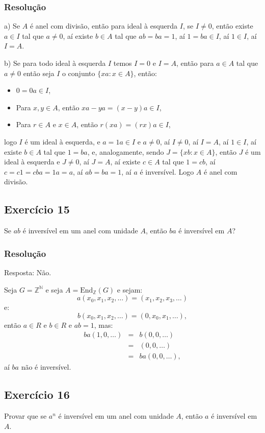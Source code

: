 \documentclass[10pt,a4paper]{article}
\begin{document}
\subsubsection*{Resolução}

a) Se $A$ é anel com divisão, então para ideal à esquerda $I$, se $I\neq 0$, então existe $a\in I$ tal que $a\neq 0$, aí existe $b\in A$ tal que $ab=ba=1$, aí $1=ba\in I$, aí $1\in I$, aí $I=A$.

\medskip
\noindent
b) Se para todo ideal à esquerda $I$ temos $I=0$ e $I=A$, então para $a\in A$ tal que $a\neq 0$ então seja $I$ o conjunto $\{xa:x\in A\}$, então:
\begin{itemize}
\item $0=0a\in I$,
\item Para $x,y\in A$, então $xa-ya=(x-y)a\in I$,
\item Para $r\in A$ e $x\in A$, então $r(xa)=(rx)a\in I$,
\end{itemize}
logo $I$ é um ideal à esquerda, e $a=1a\in I$ e $a\neq 0$, aí $I\neq0$, aí $I=A$, aí $1\in I$, aí existe $b\in A$ tal que $1=ba$, e, analogamente, sendo $J=\{xb:x\in A\}$, então $J$ é um ideal à esquerda e $J\neq 0$, aí $J=A$, aí existe $c\in A$ tal que $1=cb$, aí $c=c1=cba=1a=a$, aí $ab=ba=1$, aí $a$ é inversível. Logo $A$ é anel com divisão.

\subsection*{Exercício 15}
Se $ab$ é inversível em um anel com unidade $A$, então $ba$ é inversível em $A$?

\subsubsection*{Resolução}

Resposta: Não.

\medskip
\noindent
Seja $G=\mathbb{Z}^\mathbb{N}$ e seja $A=\mathrm{End}_\mathbb{Z}(G)$ e sejam:
\[
a(x_0,x_1,x_2,\dots)=(x_1,x_2,x_3,\dots)
\]
e:
\[
b(x_0,x_1,x_2,\dots)=(0,x_0,x_1,\dots),
\]
então $a\in R$ e $b\in R$ e $ab=1$, mas:
\[
\begin{array}{rcl}
ba(1,0,\dots)&=&b(0,0,\dots)\\&=&(0,0,\dots)\\&=&ba(0,0,\dots),
\end{array}
\]
aí $ba$ não é inversível.

\subsection*{Exercício 16}
Provar que se $a^n$ é inversível em um anel com unidade $A$, então $a$ é inversível em $A$.
\end{document}
